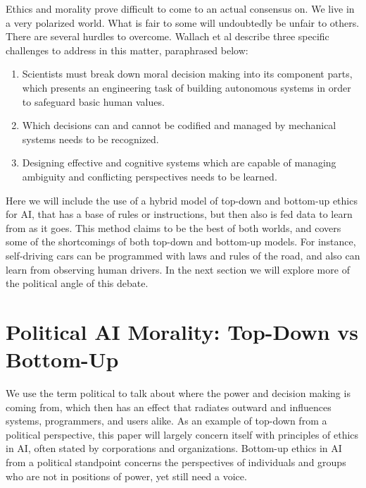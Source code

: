 \documentclass{svproc}
\begin{document}
Ethics and morality prove difficult to come to an actual consensus on. We live in a very polarized world. What is fair to some will undoubtedly be unfair to others. There are several hurdles to overcome. Wallach et al \cite{Wallach2008MachineFaculties} describe three specific challenges to address in this matter, paraphrased below:

\begin{enumerate}
    \item Scientists must break down moral decision making into its component parts, which presents an engineering task of building autonomous systems in order to safeguard basic human values.
    \item Which decisions can and cannot be codified and managed by mechanical systems needs to be recognized.
    \item Designing effective and cognitive systems which are capable of managing ambiguity and conflicting perspectives needs to be learned. \cite{Wallach2008MachineFaculties}
\end{enumerate}

Here we will include the use of a hybrid model of top-down and bottom-up ethics for AI, that has a base of rules or instructions, but then also is fed data to learn from as it goes. This method claims to be the best of both worlds, and covers some of the shortcomings of both top-down and bottom-up models. For instance, self-driving cars can be programmed with laws and rules of the road, and also can learn from observing human drivers. In the next section we will explore more of the political angle of this debate. 

\section{Political AI Morality: Top-Down vs Bottom-Up
}

We use the term political to talk about where the power and decision making is coming from, which then has an effect that radiates outward and influences systems, programmers, and users alike. As an example of top-down from a political perspective, this paper will largely concern itself with principles of ethics in AI, often stated by corporations and organizations. Bottom-up ethics in AI from a political standpoint concerns the perspectives of individuals and groups who are not in positions of power, yet still need a voice. 
\end{document}
